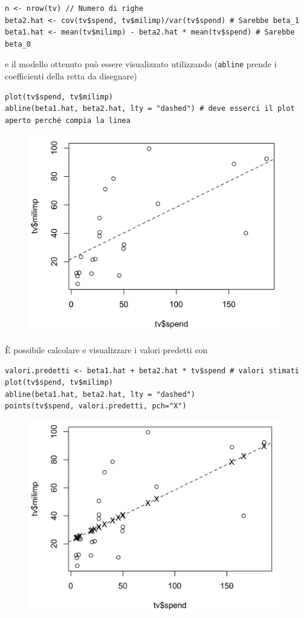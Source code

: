 \begin{lstlisting}
n <- nrow(tv) // Numero di righe
beta2.hat <- cov(tv$spend, tv$milimp)/var(tv$spend) # Sarebbe beta_1
beta1.hat <- mean(tv$milimp) - beta2.hat * mean(tv$spend) # Sarebbe beta_0
\end{lstlisting}

e il modello ottenuto può essere visualizzato utilizzando (\texttt{abline} prende i coefficienti della retta da disegnare)

\begin{lstlisting}
plot(tv$spend, tv$milimp)
abline(beta1.hat, beta2.hat, lty = "dashed") # deve esserci il plot aperto perché compia la linea
\end{lstlisting}

\begin{figure}
	\centering
	\includegraphics[width=.6\textwidth]{./notes/immagini/l9-fig2.png}
\end{figure}

\`{E} possibile calcolare e visualizzare i valori predetti con

\begin{lstlisting}
valori.predetti <- beta1.hat + beta2.hat * tv$spend # valori stimati
plot(tv$spend, tv$milimp)
abline(beta1.hat, beta2.hat, lty = "dashed")
points(tv$spend, valori.predetti, pch="X")
\end{lstlisting}

\begin{figure}
	\centering
	\includegraphics[width=.6\textwidth]{./notes/immagini/l9-fig3.png}
\end{figure}

